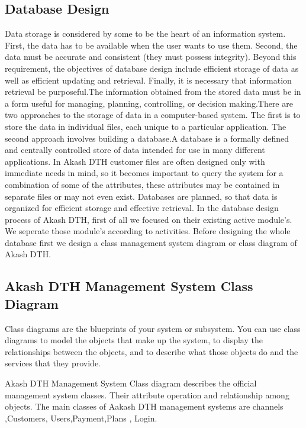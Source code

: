 \begin{spacing}{1}
\section{Database Design}
Data storage is considered by some to be the heart of an information system. First, the data has to be available when the user wants to use them. Second, the data must be accurate and consistent (they must possess integrity). Beyond this requirement, the objectives of database design include efficient storage of data as well as efficient updating and retrieval. Finally, it is necessary that information retrieval be purposeful.The information obtained from the stored data must be in a form useful for managing, planning, controlling, or decision making.There are two approaches to the storage of data in a computer-based system. The first is to store the data in individual files, each unique to a particular application. The second approach involves building a database.A database is a formally defined and centrally controlled store of data intended for use in many different applications.
In Akash DTH customer files are often designed only with immediate needs in mind, so it becomes important to query the system for a combination of some of the attributes, these attributes may be contained in separate files or may not even exist. Databases are planned, so that data is organized for efficient storage and effective retrieval. In the database design process of Akash DTH, first of all we focused on their existing active  module’s. We seperate those module’s according to activities. Before designing the whole database first we design a class management system diagram or class diagram of Akash DTH.

\subsection{Akash DTH Management System Class Diagram}
Class diagrams are the blueprints of your system or subsystem. You can use class diagrams to model the objects that make up the system, to display the relationships between the objects, and to describe what those objects do and the services that they provide.

Akash DTH Management System Class diagram describes the official management system classes. Their attribute operation and relationship among objects. The main classes of Aakash DTH management systems are channels ,Customers, Users,Payment,Plans , Login.


\end{spacing}
